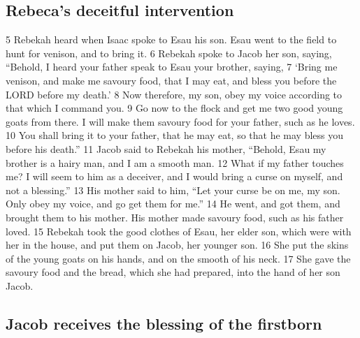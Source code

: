 \hypertarget{rebecas-deceitful-intervention}{%
\subsection{Rebeca's deceitful
intervention}\label{rebecas-deceitful-intervention}}

{5} Rebekah heard when Isaac spoke to Esau his son. Esau went to the
field to hunt for venison, and to bring it. {6} Rebekah spoke to Jacob
her son, saying, ``Behold, I heard your father speak to Esau your
brother, saying, {7} `Bring me venison, and make me savoury food, that I
may eat, and bless you before the LORD before my death.' {8} Now
therefore, my son, obey my voice according to that which I command you.
{9} Go now to the flock and get me two good young goats from there. I
will make them savoury food for your father, such as he loves. {10} You
shall bring it to your father, that he may eat, so that he may bless you
before his death.'' {11} Jacob said to Rebekah his mother, ``Behold,
Esau my brother is a hairy man, and I am a smooth man. {12} What if my
father touches me? I will seem to him as a deceiver, and I would bring a
curse on myself, and not a blessing.'' {13} His mother said to him,
``Let your curse be on me, my son. Only obey my voice, and go get them
for me.'' {14} He went, and got them, and brought them to his mother.
His mother made savoury food, such as his father loved. {15} Rebekah
took the good clothes of Esau, her elder son, which were with her in the
house, and put them on Jacob, her younger son. {16} She put the skins of
the young goats on his hands, and on the smooth of his neck. {17} She
gave the savoury food and the bread, which she had prepared, into the
hand of her son Jacob.

\hypertarget{jacob-receives-the-blessing-of-the-firstborn}{%
\subsection{Jacob receives the blessing of the
firstborn}\label{jacob-receives-the-blessing-of-the-firstborn}}

